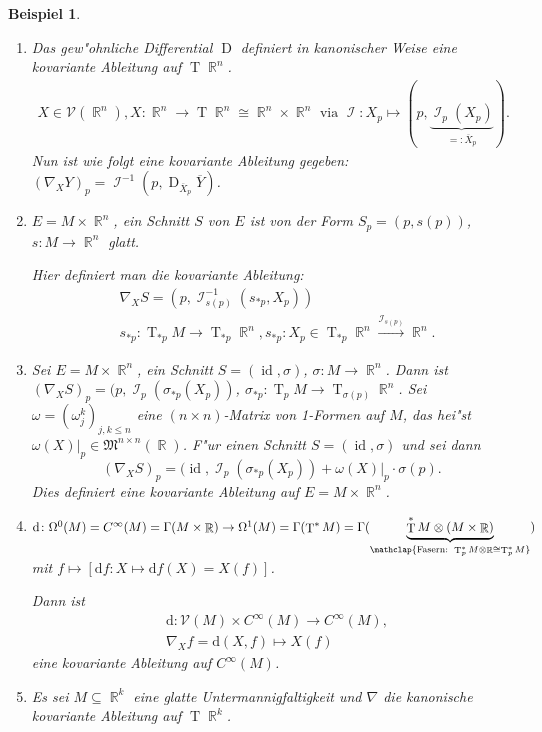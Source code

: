 \documentclass[paper=A4, twoside, chapterprefix=true, bibliography=totoc, headsepline]{scrbook}
\DeclareMathOperator{\R}{\mathbb{R}}
\DeclareMathOperator{\calI}{\mathcal{I}}
\DeclareMathOperator{\D}{D} %
\DeclareMathOperator{\Id}{id} %
\DeclareMathOperator{\T}{T} %
\newcommand{\dop}{\mathrm{d}}
\newcommand{\X}{\times}
\theoremstyle{plain}
\theoremstyle{nonumberplain}
\newtheorem{bsp}{Beispiel}
\theoremstyle{empty}
\theoremstyle{break}
\begin{document}
\begin{bsp}
  \begin{enumerate}[label=(\arabic*),leftmargin=*]
  \item Das gew"ohnliche Differential $\D$ definiert in kanonischer Weise eine kovariante Ableitung auf $\T\R^n$.
    \begin{align*}
      X \in \mathcal V(\R^n), X \colon \R^n \to \T\R^n \cong \R^n \times \R^n \text{ via } \calI\colon X_p \mapsto (p,\underbrace{\calI_p(X_p)}_{=:\overline X_p}).
    \end{align*}
    Nun ist wie folgt eine kovariante Ableitung gegeben: $(\nabla_XY)_p = \calI^{-1}(p,\D_{\overline X_p}\overline Y)$.
  \item $E = M \times \R^n$, ein Schnitt $S$ von $E$ ist von der Form $S_p = (p,s(p))$, $s \colon M \to \R^n$ glatt.

    Hier definiert man die kovariante Ableitung:
    \begin{align*}
      & \nabla_XS = (p,\calI_{s(p)}^{-1}(s_{*p},X_p))\\
      &  s_{*p}\colon \T_{*p}M \to \T_{*p}\R^n, s_{*p}\colon X_p \in \T_{*p}\R^n \xrightarrow{\calI_{s(p)}} \R^n.
    \end{align*}
  \item Sei $E = M \times \R^n$, ein Schnitt $S = (\Id, \sigma)$, $\sigma: M \to \R^n$. Dann ist $(\nabla_X S)_p = (p, \calI_p(\sigma_{*p}(X_p))$, $\sigma_{*p}: \T_pM \to \T_{\sigma(p)}\R^n$. Sei $ \omega = (\omega_j^k)_{j,k \le n}$ eine $(n\times n)$-Matrix von 1-Formen auf $M$, das hei"st $\omega(X)|_p \in \mathfrak M^{n\times n}(\R)$.
    F"ur einen Schnitt $S = (\Id, \sigma)$ und sei dann
    \[ (\nabla_XS)_p = (\Id, \calI_p(\sigma_{*p}(X_p)) + \omega(X)|_p \cdot \sigma(p). \]
    Dies definiert eine kovariante Ableitung auf $E = M \X \R^n$.
  \item $\dop \colon \Omega^0(M) = C^{\infty}(M) = \Gamma(M\times \R) \to \Omega^1(M) = \Gamma(\T^{*}M) = \Gamma(\underbrace{\T^{*}M \otimes (M \times \R)}_{\mathclap{\text{Fasern: } \T_p^{*}M\otimes\R \cong \T_p^{*}M}})$ mit $f \mapsto [\dop f \colon X \mapsto \dop f(X) = X(f)]$.

    Dann ist
    \begin{align*}
      & \dop \colon \mathcal V(M) \times C^{\infty}(M) \to C^{\infty}(M),\\
      & \nabla_Xf = \dop (X,f) \mapsto X(f)
    \end{align*}
    eine kovariante Ableitung auf $C^{\infty}(M)$.
  \item
    Es sei $M \subseteq \R^k$ eine glatte Untermannigfaltigkeit und $\nabla$ die kanonische kovariante Ableitung auf $\T \R^k$.


\end{enumerate}
\end{bsp}
\end{document}
